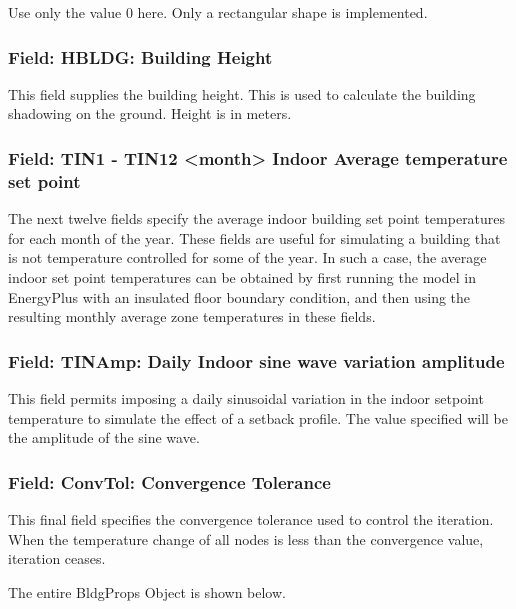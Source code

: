 Use only the value 0 here. Only a rectangular shape is implemented.

\subsubsection{Field: HBLDG: Building Height}\label{field-hbldg-building-height}

This field supplies the building height. This is used to calculate the building shadowing on the ground. Height is in meters.

\subsubsection{Field: TIN1 - TIN12 \textless{}month\textgreater{} Indoor Average temperature set point}\label{field-tin1---tin12-month-indoor-average-temperature-set-point}

The next twelve fields specify the average indoor building set point temperatures for each month of the year. These fields are useful for simulating a building that is not temperature controlled for some of the year. In such a case, the average indoor set point temperatures can be obtained by first running the model in EnergyPlus with an insulated floor boundary condition, and then using the resulting monthly average zone temperatures in these fields.

\subsubsection{Field: TINAmp: Daily Indoor sine wave variation amplitude}\label{field-tinamp-daily-indoor-sine-wave-variation-amplitude}

This field permits imposing a daily sinusoidal variation in the indoor setpoint temperature to simulate the effect of a setback profile. The value specified will be the amplitude of the sine wave.

\subsubsection{Field: ConvTol: Convergence Tolerance}\label{field-convtol-convergence-tolerance}

This final field specifies the convergence tolerance used to control the iteration. When the temperature change of all nodes is less than the convergence value, iteration ceases.

The entire BldgProps Object is shown below.

